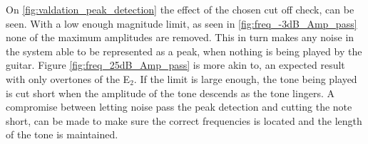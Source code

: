 On \ref{fig:valdation_peak_detection} the effect of the chosen cut off check, can be seen.
With a low enough magnitude limit, as seen in \ref{fig:freq_-3dB_Amp_pass} none of the maximum amplitudes are removed.
This in turn makes any noise in the system able to be represented as a peak, when nothing is being played by the guitar.
Figure \ref{fig:freq_25dB_Amp_pass} is more akin to, an expected result with only overtones of the E$_2$.
If the limit is large enough, the tone being played is cut short when the amplitude of the tone descends as the tone lingers.
A compromise between letting noise pass the peak detection and cutting the note short, can be made to make sure the correct frequencies is located and the length of the tone is maintained.
